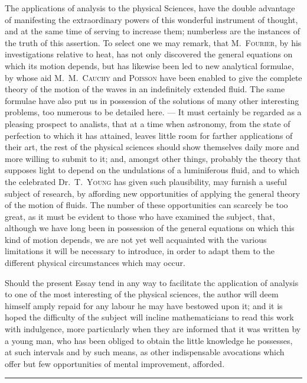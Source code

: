 \documentclass[11pt,notitlepage]{amsart}
\let\Person\textsc
\def\Crule{\begin{center}\rule[.5ex]{5em}{.2pt}\\[10pt]\end{center}}
\begin{document}
The applications of analysis to the physical Sciences, have the double
advantage of manifesting the extraordinary powers of this wonderful instrument
of thought, and at the same time of serving to increase them; numberless
are the instances of the truth of this assertion. To select one we may remark,
that M.~\Person{Fourier}, by his investigations relative to heat,
has not only discovered the general equations
on which its motion depends, but has likewise
been led to new analytical formulae, by whose aid M.~M.~\Person{Cauchy}
and \Person{Poisson}
have been enabled to give the complete theory of the motion of the waves
in an indefinitely extended fluid. The same formulae have also put us in
possession of the solutions of many other interesting problems, too numerous
to be detailed here. --- It must certainly be regarded as a pleasing prospect
to analists, that at a time when astronomy, from the state of perfection to
which it has attained, leaves little room for farther applications of their art,
the rest of the physical sciences should show themselves daily more and more
willing to submit to it; and, amongst other things, probably the theory that
supposes light to depend on the undulations of a luminiferous fluid, and to
which the celebrated Dr.~T.~\Person{Young} has
given such plausibility, may furnish
a useful subject of research, by affording new opportunities of applying the
general theory of the motion of fluids. The number of these opportunities
can scarcely be too great, as it must be evident to those who have examined
the subject, that, although we have long been in possession of the general
equations on which this kind of motion depends, we are not yet well
acquainted with the various limitations it will be necessary to introduce, in
order to adapt them to the different physical circumstances which may occur.

Should the present Essay tend in any way to facilitate thc application
of analysis to one of the most interesting of the physical sciences, the author
will deem himself amply repaid for any labour he may have bestowed upon
it; and it is hoped the difficulty of the subject will incline mathematicians to
read this work with indulgence, more particularly when they are informed
that it was written by a young man, who has been obliged to obtain the little
knowledge he possesses, at such intervals and by such means, as other 
indispensable avocations which offer
but few opportunities of mental improvement,
afforded.
\Crule
\bigskip

\end{document}
